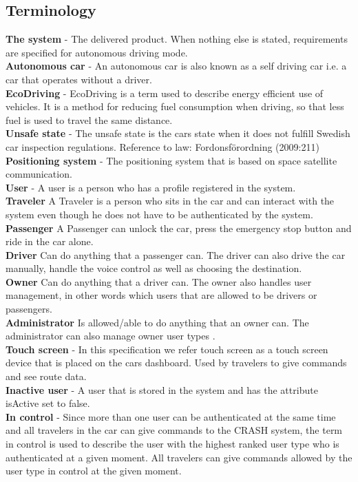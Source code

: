 \documentclass{article}
\begin{document}
\subsection{Terminology}
\noindent\textbf{The system} - The delivered product. When nothing else is stated, requirements are specified for autonomous driving mode.\\
\textbf{Autonomous car} - An autonomous car is also known as a self driving car i.e. a car that operates without a driver. \\
\textbf{EcoDriving} - EcoDriving is a term used to describe energy efficient use of vehicles. It is a method for reducing fuel consumption when driving, so that less fuel is used to travel the same distance.\\
\textbf{Unsafe state} - The unsafe state is the cars state when it does not fulfill Swedish car inspection regulations.
Reference to law: Fordonsförordning (2009:211) \\
\textbf{Positioning system} - The positioning system that is based on space satellite communication.\\
\textbf{User} - A user is a person who has a profile registered in the system. \\
\textbf{Traveler} A Traveler is a person who sits in the car and can interact with the system even though he does not have to be authenticated by the system.\\
\textbf{Passenger} A Passenger can unlock the car, press the emergency stop button and ride in the car alone.\\
\textbf{Driver} Can do anything that a passenger can.
The driver can also drive the car manually, handle the voice control as well as choosing the destination. \\
\textbf{Owner} Can do anything that a driver can. The owner also handles user management, in other words which users that are allowed to be drivers or passengers. \\
\textbf{Administrator} Is allowed/able to do anything that an owner can. The administrator can also manage owner user types . \\
\textbf{Touch screen} - In this specification we refer touch screen as a touch screen device that is placed on the cars dashboard. Used by travelers to  give commands and see route data. \\
\textbf{Inactive user} - A user that is stored in the system and has the attribute isActive set to false. \\
\textbf{In control} - Since more than one user can be authenticated at the same time and all travelers in the car can give commands to the CRASH system, the term in control is used to describe the user with the highest ranked user type who is authenticated at a given moment. All travelers can give commands allowed by the user type in control at the given moment.\\
\end{document}

